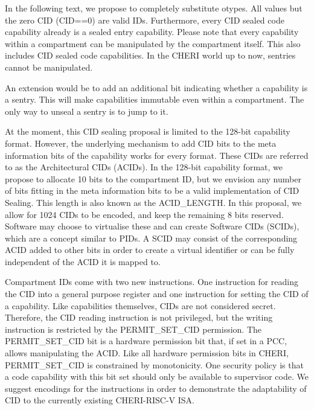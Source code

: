 In the following text, we propose to completely substitute otypes.
All values but the zero CID (CID==0) are valid IDs.
Furthermore, every CID sealed code capability already is a sealed entry capability.
Please note that every capability within a compartment can be manipulated by the compartment itself.
This also includes CID sealed code capabilities.
In the CHERI world up to now, sentries cannot be manipulated.

An extension would be to add an additional bit indicating whether a capability is a sentry.
This will make capabilities immutable even within a compartment.
The only way to unseal a sentry is to jump to it.

At the moment, this CID sealing proposal is limited to the 128-bit capability format.
However, the underlying mechanism to add CID bits to the meta information bits of the capability works for every format.
These CIDs are referred to as the Architectural CIDs (ACIDs).
In the 128-bit capability format, we propose to allocate 10 bits to the compartment ID, but we envision any number of bits fitting in the meta information bits to be a valid implementation of CID Sealing.
This length is also known as the ACID\_LENGTH.
In this proposal, we allow for 1024 CIDs to be encoded, and keep the remaining 8 bits reserved.
Software may choose to virtualise these and can create Software CIDs (SCIDs), which are a concept similar to PIDs.
A SCID may consist of the corresponding ACID added to other bits in order to create a virtual identifier or can be fully independent of the ACID it is mapped to.

Compartment IDs come with two new instructions.
One instruction for reading the CID into a general purpose register and one instruction for setting the CID of a capability.
Like capabilities themselves, CIDs are not considered secret.
Therefore, the CID reading instruction is not privileged, but the writing instruction is restricted by the PERMIT\_SET\_CID permission.
The PERMIT\_SET\_CID bit is a hardware permission bit that, if set in a PCC, allows manipulating the ACID.
Like all hardware permission bits in CHERI, PERMIT\_SET\_CID is constrained by monotonicity.
One security policy is that a code capability with this bit set should only be available to supervisor code.
We suggest encodings for the instructions in order to demonstrate the adaptability of CID to the currently existing CHERI-RISC-V ISA.

